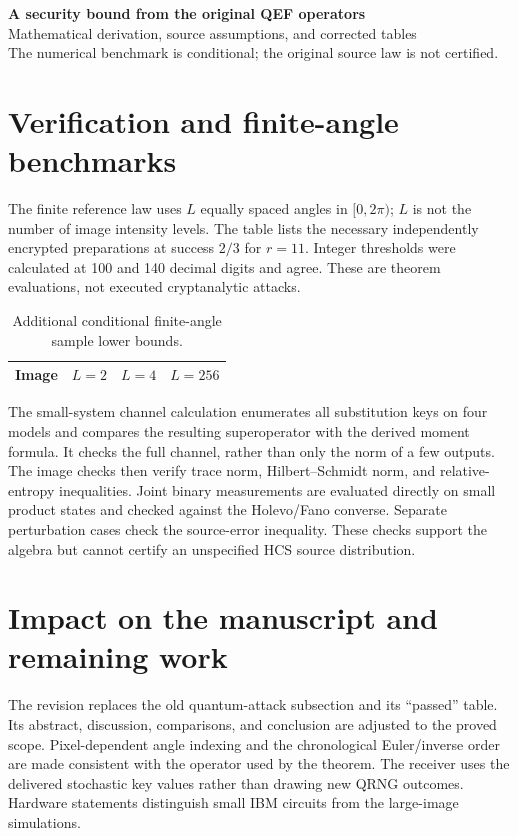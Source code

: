 \documentclass[11pt,a4paper]{article}
\begin{document}
\begin{center}
{\LARGE\bfseries A security bound from the original QEF operators}\\[5pt]
{\large Mathematical derivation, source assumptions, and corrected tables}\\[4pt]
{\small The numerical benchmark is conditional; the original source law is not certified.}
\end{center}

\clearpage
\section{Verification and finite-angle benchmarks}
The finite reference law uses $L$ equally spaced angles in $[0,2\pi)$;
$L$ is not the number of image intensity levels. The table lists the
necessary independently encrypted preparations at success $2/3$ for
$r=11$. Integer thresholds were calculated at 100 and 140 decimal digits
and agree. These are theorem evaluations, not executed cryptanalytic attacks.

\begin{table}[htbp]\centering\small
\caption{Additional conditional finite-angle sample lower bounds.}
\begin{tabular}{lrrr}
\toprule
Image & $L=2$ & $L=4$ & $L=256$\\\midrule

\end{tabular}
\end{table}



The small-system channel calculation enumerates all substitution keys
on four models and compares the resulting superoperator with the
derived moment formula. It checks the full channel, rather than only
the norm of a few outputs. The image checks then verify trace norm,
Hilbert--Schmidt norm, and relative-entropy inequalities. Joint binary
measurements are evaluated directly on small product states and checked
against the Holevo/Fano converse. Separate perturbation cases check the
source-error inequality. These checks support the algebra but cannot
certify an unspecified HCS source distribution.

\section{Impact on the manuscript and remaining work}
The revision replaces the old quantum-attack subsection and its
``passed'' table. Its abstract, discussion, comparisons, and conclusion
are adjusted to the proved scope. Pixel-dependent angle indexing and
the chronological Euler/inverse order are made consistent with the
operator used by the theorem. The receiver uses the delivered stochastic
key values rather than drawing new QRNG outcomes. Hardware statements
distinguish small IBM circuits from the large-image simulations.
\end{document}
